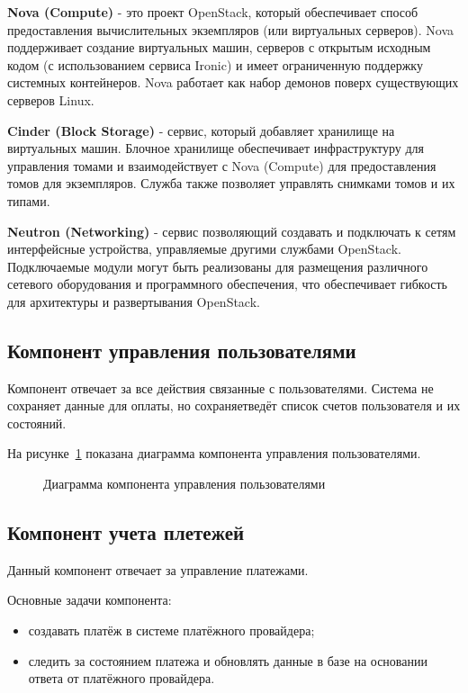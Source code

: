 \textbf{Nova (Compute)} - это проект OpenStack, который обеспечивает способ предоставления вычислительных экземпляров (или виртуальных серверов). Nova поддерживает создание виртуальных машин, серверов с открытым исходным кодом (с использованием сервиса Ironic) и имеет ограниченную поддержку системных контейнеров. Nova работает как набор демонов поверх существующих серверов Linux.

\textbf{Cinder (Block Storage)} - сервис, который добавляет хранилище на виртуальных машин. Блочное хранилище обеспечивает инфраструктуру для управления томами и взаимодействует с Nova (Compute) для предоставления томов для экземпляров. Служба также позволяет управлять снимками томов и их типами.

\textbf{Neutron (Networking)} - сервис позволяющий создавать и подключать к сетям интерфейсные устройства, управляемые другими службами OpenStack. Подключаемые модули могут быть реализованы для размещения различного сетевого оборудования и программного обеспечения, что обеспечивает гибкость для архитектуры и развертывания OpenStack.

\subsection{Компонент управления пользователями}\label{sec:subs4}
Компонент отвечает за все действия связанные с пользователями. Система не сохраняет данные для оплаты, но сохраняетведёт список счетов пользователя и их состояний.

На рисунке~\ref{fig:users_control_scheme} показана диаграмма компонента управления пользователями.
\begin{figure}[ht]
  \caption{Диаграмма компонента управления пользователями}\label{fig:users_control_scheme}
\end{figure}

\subsection{Компонент учета плетежей}\label{sec:subs5}
Данный компонент отвечает за управление платежами.

Основные задачи компонента:
\begin{itemize}
  \item создавать платёж в системе платёжного провайдера;
  \item следить за состоянием платежа и обновлять данные в базе на основании ответа от платёжного провайдера. 
\end{itemize}


